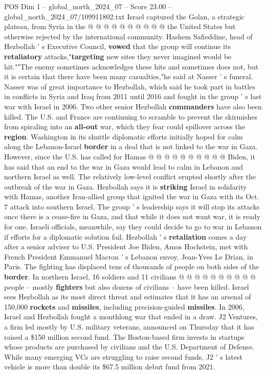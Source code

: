 \begin{textsample}{POS Dim 1 – global\_north\_2024\_07 – Score 23.00 – global\_north\_2024\_07/109911802.txt}
Israel captured the Golan, a strategic plateau, from Syria in the @ @ @ @ @ @ @ @ @ @ the United States but otherwise rejected by the international community.
Hashem Safieddine, head of Hezbollah ' s Executive Council, \textbf{vowed} that the group will continue its \textbf{retaliatory} attacks,"\textbf{targeting} new sites they never imagined would be hit.""The enemy sometimes acknowledges these hits and sometimes does not, but it is certain that there have been many casualties,"he said at Nasser ' s funeral.
Nasser was of great importance to Hezbollah, which said he took part in battles in conflicts in Syria and Iraq from 2011 until 2016 and fought in the group ' s last war with Israel in 2006.
Two other senior Hezbollah \textbf{commanders} have also been killed.
The U.S. and France are continuing to scramble to prevent the skirmishes from spiraling into an \textbf{all-out} war, which they fear could spillover across the \textbf{region}.
Washington in its shuttle diplomatic efforts initially hoped for calm along the Lebanon-Israel \textbf{border} in a deal that is not linked to the war in Gaza.
However, since the U.S. has called for Hamas @ @ @ @ @ @ @ @ @ @ Biden, it has said that an end to the war in Gaza would lead to calm in Lebanon and northern Israel as well.
The relatively low-level conflict erupted shortly after the outbreak of the war in Gaza.
Hezbollah says it is \textbf{striking} Israel in solidarity with Hamas, another Iran-allied group that ignited the war in Gaza with its Oct. 7 attack into southern Israel.
The group ' s leadership says it will stop its attacks once there is a cease-fire in Gaza, and that while it does not want war, it is ready for one.
Israeli officials, meanwhile, say they could decide to go to war in Lebanon if efforts for a diplomatic solution fail.
Hezbollah ' s \textbf{retaliation} comes a day after a senior adviser to U.S.
President Joe Biden, Amos Hochstein, met with French President Emmanuel Macron ' s Lebanon envoy, Jean-Yves Le Drian, in Paris.
The fighting has displaced tens of thousands of people on both sides of the \textbf{border}.
In northern Israel, 16 soldiers and 11 civilians @ @ @ @ @ @ @ @ @ @ people -- mostly \textbf{fighters} but also dozens of civilians -- have been killed.
Israel sees Hezbollah as its most direct threat and estimates that it has an arsenal of 150,000 \textbf{rockets} and \textbf{missiles}, including precision-guided \textbf{missiles}.
In 2006, Israel and Hezbollah fought a monthlong war that ended in a draw.
J2 Ventures, a firm led mostly by U.S. military veterans, announced on Thursday that it has raised a \$150 million second fund.
The Boston-based firm invests in startups whose products are purchased by civilians and the U.S.
Department of Defense.
While many emerging VCs are struggling to raise second funds, J2 ' s latest vehicle is more than double its \$67.5 million debut fund from 2021.

\end{textsample}
